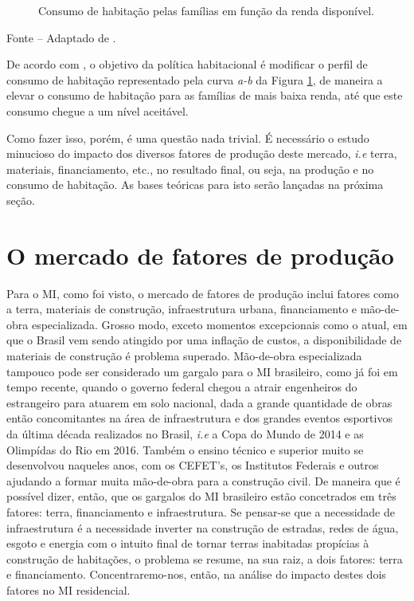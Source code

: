\documentclass[
	12pt,				%
	oneside,			%
	a4paper,			%
	chapter=TITLE,		%
	section=TITLE,		%
	english,			%
	brazil				%
	]{abntex2}
\newcommand{\bcenter}{\begin{center}}
\newcommand{\ecenter}{\end{center}}
\begin{document}
\begin{refsection}
\begin{figure}[H]
{}

\caption{Consumo de habitação pelas famílias em função da renda disponível.}\label{fig:basicModel}
\end{figure}
\bcenter

\small Fonte -- Adaptado de \textcite[p.~250]{bertaud}.
\ecenter

De acordo com \textcite[p.~250]{bertaud}, o objetivo da política habitacional é modificar
o perfil de consumo de habitação representado pela curva \emph{a-b} da Figura
\ref{fig:basicModel}, de maneira a elevar o consumo de habitação para as
famílias de mais baixa renda, até que este consumo chegue a um nível aceitável.

Como fazer isso, porém, é uma questão nada trivial. É necessário o estudo
minucioso do impacto dos diversos fatores de produção deste mercado, \emph{i.e}
terra, materiais, financiamento, etc., no resultado final, ou seja, na produção
e no consumo de habitação. As bases teóricas para isto serão lançadas na próxima
seção.

\hypertarget{o-mercado-de-fatores-de-produuxe7uxe3o}{%
\section{O mercado de fatores de produção}\label{o-mercado-de-fatores-de-produuxe7uxe3o}}

Para o \gls{MI}, como foi visto, o mercado de fatores de produção inclui fatores
como a terra, materiais de construção, infraestrutura urbana, financiamento e
mão-de-obra especializada. Grosso modo, exceto momentos excepcionais como o
atual, em que o Brasil vem sendo atingido por uma inflação de custos, a
disponibilidade de materiais de construção é problema superado. Mão-de-obra
especializada tampouco pode ser considerado um gargalo para o \gls{MI}
brasileiro, como já foi em tempo recente, quando o governo federal chegou a
atrair engenheiros do estrangeiro para atuarem em solo nacional, dada a grande
quantidade de obras então concomitantes na área de infraestrutura e dos grandes
eventos esportivos da última década realizados no Brasil, \emph{i.e} a Copa do Mundo
de 2014 e as Olimpídas do Rio em 2016. Também o ensino técnico e superior muito
se desenvolvou naqueles anos, com os CEFET's, os Institutos Federais e outros
ajudando a formar muita mão-de-obra para a construção civil. De maneira que é
possível dizer, então, que os gargalos do \gls{MI} brasileiro estão concetrados
em três fatores: terra, financiamento e infraestrutura. Se pensar-se que a
necessidade de infraestrutura é a necessidade inverter na construção de estradas,
redes de água, esgoto e energia com o intuito final de tornar terras inabitadas
propícias à construção de habitações, o problema se resume, na sua raiz, a dois
fatores: terra e financiamento. Concentraremo-nos, então, na análise do impacto
destes dois fatores no \gls{MI} residencial.


\end{refsection}
\end{document}
